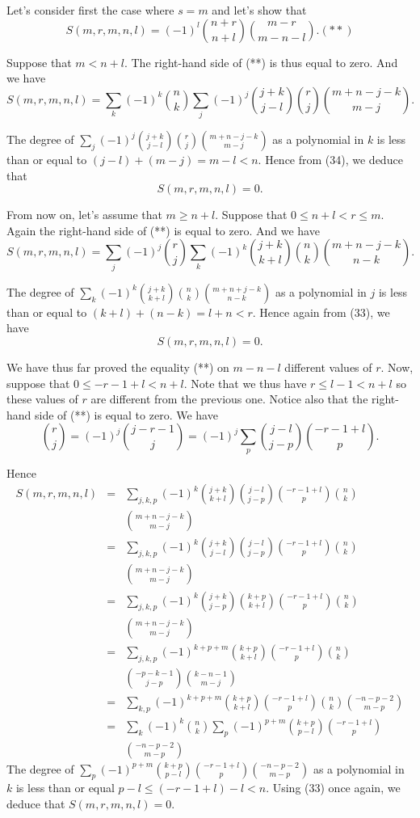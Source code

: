 \documentclass[a4paper,12pt]{article}
\begin{document}
Let's consider first the case where $s = m$ and let's show that
\[ S(m, r, m, n, l) = (-1)^l {n+r \choose n+l}{m-r \choose
  m-n-l}. (**)\]

Suppose that $m < n+l$.  The right-hand side of (**) is thus equal to
zero. And we have
\[ S(m, r, m, n, l) = \sum_k (-1)^k {n \choose k} \sum_j (-1)^j {j+k
  \choose j-l} {r \choose j}{m+n-j-k\choose m-j}.\]

The degree of $\sum_j (-1)^j {j+k\choose j-l}{r \choose
  j}{m+n-j-k\choose m-j}$ as a polynomial in $k$ is less than or equal
to $(j-l) + (m-j) = m - l < n$.  Hence from (34), we deduce that
\[ S(m, r, m, n, l) = 0.\]

From now on, let's assume that $m \ge n+l$.  Suppose that $0 \le n+l <
r \le m$.  Again the right-hand side of (**) is equal to zero.  And we
have
\[ S(m, r, m, n, l) = \sum_j (-1)^j {r \choose j} \sum_k (-1)^k {j+k
  \choose k+l}{n \choose k} {m+n-j-k \choose n-k}.\]

The degree of $\sum_k (-1)^k {j+k \choose k+l}{n \choose k}{m+n+j-k
  \choose n-k}$ as a polynomial in $j$ is less than or equal to $(k+l)
+ (n-k) = l+n < r$.  Hence again from (33), we have
\[ S(m, r, m, n, l) = 0.\]

We have thus far proved the equality (**) on $m-n-l$ different values
of $r$.  Now, suppose that $0 \le -r-1+l < n+l$.  Note that we thus
have $r \le l-1 < n+l$ so these values of $r$ are different from the
previous one.  Notice also that the right-hand side of (**) is equal
to zero.  We have
\[ {r \choose j} = (-1)^j {j-r-1 \choose j} = (-1)^j \sum_p {j-l
  \choose j-p}{-r-1+l\choose p}.\]

Hence
\begin{eqnarray*}
  S(m,r,m,n,l) &=& \sum_{j,k,p}(-1)^k {j+k \choose k+l}{j-l\choose
    j-p}{-r-1+l\choose p}{n \choose k}\\ &&{m+n-j-k\choose m-j} \\
  &=& \sum_{j,k,p}(-1)^k {j+k \choose j-l}{j-l\choose
    j-p}{-r-1+l\choose p}{n \choose k}\\ &&{m+n-j-k\choose m-j} \\
  &=& \sum_{j,k,p}(-1)^k {j+k \choose j-p}{k+p \choose k+l}{-r-1+l
    \choose p} {n \choose k}\\ && {m+n-j-k \choose m-j} \\
  &=& \sum_{j,k,p}(-1)^{k+p+m} {k+p \choose k+l}{-r-1+l \choose p}{n
    \choose k} \\ && {-p -k -1 \choose j - p}{k-n-1\choose m-j} \\
  &=& \sum_{k,p}(-1)^{k+p+m} {k+p \choose k+l} {-r-1+l \choose p}{n
    \choose k} {-n-p-2 \choose m-p} \\
  &=& \sum_k (-1)^k {n \choose k} \sum_p (-1)^{p+m} {k+p \choose
    p-l}{-r-1+l \choose p}\\ && {-n-p-2 \choose m-p}
\end{eqnarray*}
The degree of $\sum_p (-1)^{p+m} {k+p \choose p-l}{-r-1+l\choose
  p}{-n-p-2\choose m-p}$ as a polynomial in $k$ is less than or equal
$p-l \le (-r-1+l) -l < n$.  Using (33) once again, we deduce that
$S(m,r,m,n,l) = 0$.
\end{document}
